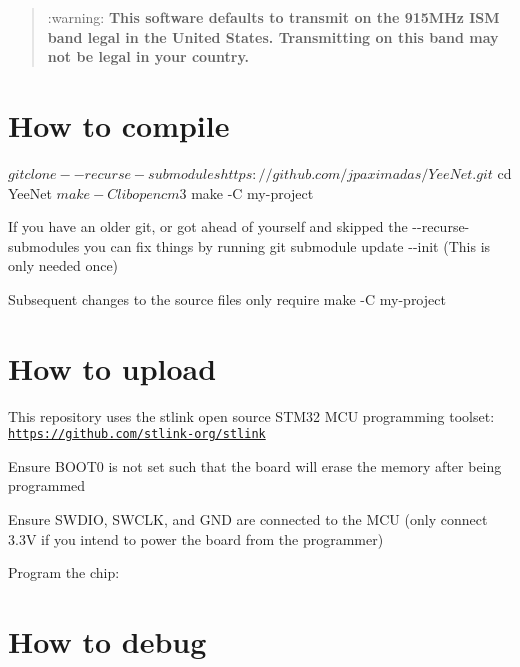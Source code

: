 \begin{quote}
\+:warning\+: {\bfseries This software defaults to transmit on the 915\+M\+Hz I\+SM band legal in the United States. Transmitting on this band may not be legal in your country.} \end{quote}


\section*{How to compile}


\begin{DoxyCode}
$ git clone --recurse-submodules https://github.com/jpaximadas/YeeNet.git
$ cd YeeNet
$ make -C libopencm3
$ make -C my-project
\end{DoxyCode}


If you have an older git, or got ahead of yourself and skipped the {\ttfamily -\/-\/recurse-\/submodules} you can fix things by running {\ttfamily git submodule update -\/-\/init} (This is only needed once)

Subsequent changes to the source files only require {\ttfamily make -\/C my-\/project}

\section*{How to upload}

This repository uses the stlink open source S\+T\+M32 M\+CU programming toolset\+: \href{https://github.com/stlink-org/stlink}{\tt https\+://github.\+com/stlink-\/org/stlink}


\begin{DoxyEnumerate}
\item Ensure B\+O\+O\+T0 is not set such that the board will erase the memory after being programmed
\item Ensure S\+W\+D\+IO, S\+W\+C\+LK, and G\+ND are connected to the M\+CU (only connect 3.\+3V if you intend to power the board from the programmer)
\item Program the chip\+: 

\end{DoxyEnumerate}

\section*{How to debug}

